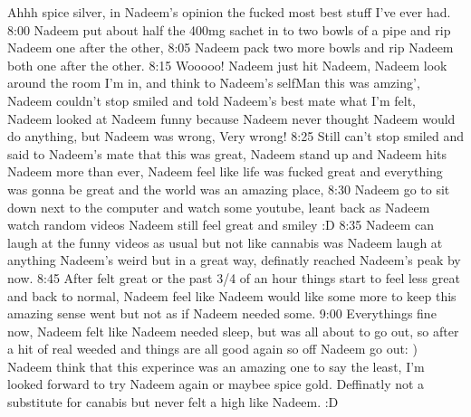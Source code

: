 \documentclass[12pt]{book}
\begin{document}
Ahhh spice silver, in Nadeem's opinion the fucked most best stuff I've ever had. 8:00 Nadeem put about half the 400mg sachet in to two bowls of a pipe and rip Nadeem one after the other, 8:05 Nadeem pack two more bowls and rip Nadeem both one after the other. 8:15 Wooooo! Nadeem just hit Nadeem, Nadeem look around the room I'm in, and think to Nadeem's selfMan this was amzing', Nadeem couldn't stop smiled and told Nadeem's best mate what I'm felt, Nadeem looked at Nadeem funny because Nadeem never thought Nadeem would do anything, but Nadeem was wrong, Very wrong! 8:25 Still can't stop smiled and said to Nadeem's mate that this was great, Nadeem stand up and Nadeem hits Nadeem more than ever, Nadeem feel like life was fucked great and everything was gonna be great and the world was an amazing place, 8:30 Nadeem go to sit down next to the computer and watch some youtube, leant back as Nadeem watch random videos Nadeem still feel great and smiley :D 8:35 Nadeem can laugh at the funny videos as usual but not like cannabis was Nadeem laugh at anything Nadeem's weird but in a great way, definatly reached Nadeem's peak by now. 8:45 After felt great or the past 3/4 of an hour things start to feel less great and back to normal, Nadeem feel like Nadeem would like some more to keep this amazing sense went but not as if Nadeem needed some. 9:00 Everythings fine now, Nadeem felt like Nadeem needed sleep, but was all about to go out, so after a hit of real weeded and things are all good again so off Nadeem go out: ) Nadeem think that this experince was an amazing one to say the least, I'm looked forward to try Nadeem again or maybee spice gold. Deffinatly not a substitute for canabis but never felt a high like Nadeem. :D
\end{document}
